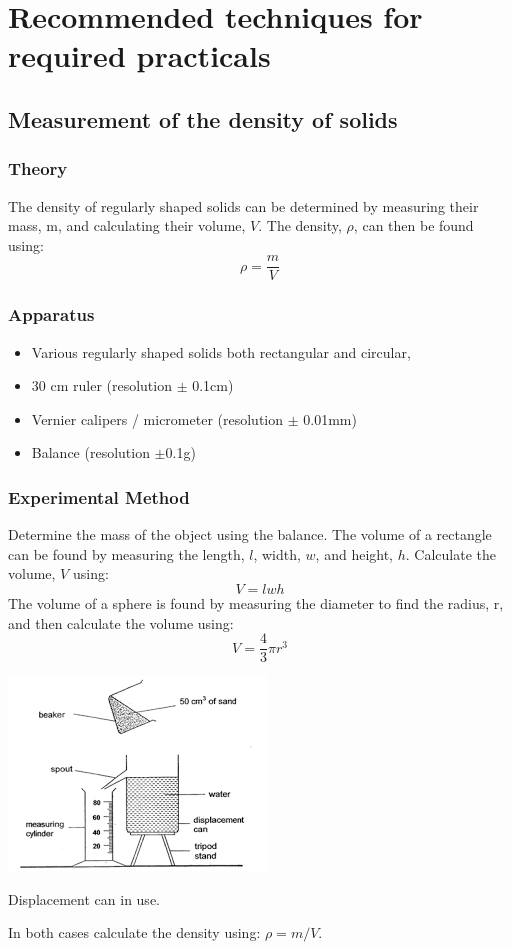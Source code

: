 
\chapter{Recommended techniques for required practicals}
\section{Measurement of the density of solids}
\subsection{Theory}
The density of regularly shaped solids can be determined by measuring their mass, m, and
calculating their volume, $V$. The density, $\rho$, can then be found using:
 \[ \rho = \frac{m}{V}\]


\subsection{Apparatus}
\begin{itemize}

\item Various regularly shaped solids both rectangular and circular,
\item 30 cm ruler (resolution $\pm$ 0.1cm)
\item Vernier calipers / micrometer (resolution $\pm$ 0.01mm)
\item Balance (resolution $\pm$0.1g)
\end{itemize}
\subsection{Experimental Method}
Determine the mass of the object using the balance. 
The volume of a rectangle can be found by measuring the length, $l$, width, $w$, and height, $h$. Calculate the volume, $V$ using:
\[V = l  w  h\]
The volume of a sphere is found by measuring the diameter to find the radius, r, and then calculate the volume using: \[ V= \frac{4}{3} \pi r^{3}\]

\begin{marginfigure}
\includegraphics{eurekacan.png}
\caption{Displacement can in use.}
\end{marginfigure} 
In both cases calculate the density using: $ \rho = m/V$.
